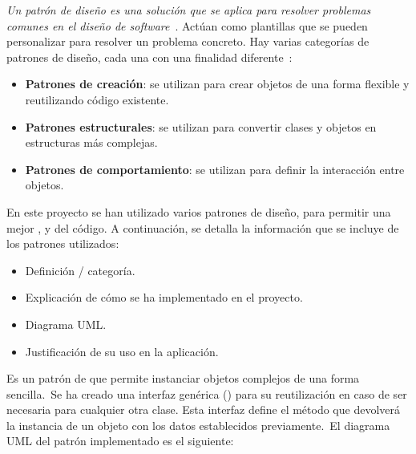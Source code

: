 
\textit{Un patrón de diseño es una solución que se aplica para resolver problemas comunes en el
diseño de software}~\cite{designPatternDefinition}.
Actúan como plantillas que se pueden personalizar para resolver un problema concreto.
Hay varias categorías de patrones de diseño, cada una con una finalidad diferente~\cite{designPatternClassification}:
\begin{itemize}
	\item \textbf{Patrones de creación}: se utilizan para crear objetos de una forma flexible y reutilizando código
	existente.
	\item \textbf{Patrones estructurales}: se utilizan para convertir clases y objetos en estructuras más complejas.
	\item \textbf{Patrones de comportamiento}: se utilizan para definir la interacción entre objetos.
\end{itemize}
\label{itm:categorias-patrones}

En este proyecto se han utilizado varios patrones de diseño, para permitir una mejor
,  y  del código.
A continuación, se detalla la información que se incluye de los patrones utilizados:
\begin{itemize}
	\item Definición / categoría.
	\item Explicación de cómo se ha implementado en el proyecto.
	\item Diagrama UML\@.
	\item Justificación de su uso en la aplicación.
\end{itemize}
\label{itm:uso-patrones}


Es un patrón de  que permite instanciar objetos complejos de una forma sencilla.\ Se ha creado una
interfaz genérica () para su reutilización en caso de ser necesaria para cualquier otra clase.
Esta interfaz define el método  que devolverá la instancia de un objeto con los datos establecidos
previamente.\ El diagrama UML del patrón implementado es el siguiente:

